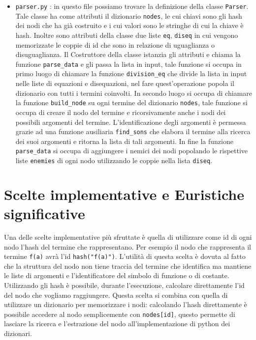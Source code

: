 \documentclass[a4paper, 11pt]{article}
\begin{document}
\begin{itemize}
\item \verb|parser.py| : in questo file possiamo trovare la definizione della classe \verb|Parser|. Tale classe ha come attributi il dizionario \verb|nodes|, le cui chiavi sono gli hash dei nodi che ha già costruito e i cui valori sono le stringhe di cui la chiave è hash. Inoltre sono attributi della classe due liste \verb|eq|, \verb|diseq| in cui vengono memorizzate le coppie di id che sono in relazione di uguaglianza o disuguaglianza. Il Costruttore della classe istanzia gli attributi e chiama la funzione \verb|parse_data| e gli passa la lista in input, tale funzione si occupa in primo luogo di chiamare la funzione \verb|division_eq| che divide la lista in input nelle liste di equazioni e disequazioni, nel fare quest'operazione popola il dizionario con tutti i termini coinvolti. In secondo luogo si occupa di chiamare la funzione \verb|build_node| su ogni termine del dizionario \verb|nodes|, tale funzione si occupa di creare il nodo del termine e ricorsivamente anche i nodi dei possibili argomenti del termine. L'identificazione degli argomenti è permessa grazie ad una funzione ausiliaria \verb|find_sons| che elabora il termine alla ricerca dei suoi argomenti e ritorna la lista di tali argomenti. In fine la funzione \verb|parse_data| si occupa di aggiungere i nemici dei nodi popolando le rispettive liste \verb|enemies| di ogni nodo utilizzando le coppie nella lista \verb|diseq|.
\end{itemize}

\section*{Scelte implementative e Euristiche significative}
Una delle scelte implementative più sfruttate è quella di utilizzare come id di ogni nodo l'hash del termine che rappresentano. Per esempio il nodo che rappresenta il termine \verb|f(a)| avrà l'id \verb|hash("f(a)")|. L'utilità di questa scelta è dovuta al fatto che la struttura del nodo non tiene traccia del termine che identifica ma mantiene le liste di argomenti e l'identificatore del simbolo di funzione o di costante. Utilizzando gli hash è possibile, durante l'esecuzione, calcolare direttamente l'id del nodo che vogliamo raggiungere. Questa scelta si combina con quella di utilizzare un dizionario per memorizzare i nodi: calcolando l'hash direttamente è possibile accedere al nodo semplicemente con \verb|nodes[id]|, questo permette di lasciare la ricerca e l'estrazione del nodo all'implementazione di python dei dizionari.
\end{document}
